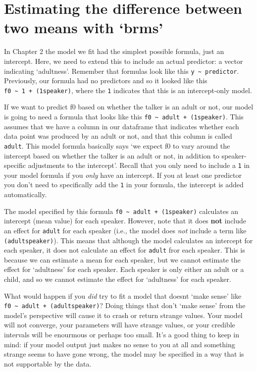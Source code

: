 \documentclass[
]{book}
\begin{document}
\hypertarget{estimating-the-difference-between-two-means-with-brms}{%
\section{Estimating the difference between two means with `brms'}\label{estimating-the-difference-between-two-means-with-brms}}

In Chapter 2 the model we fit had the simplest possible formula, just an intercept. Here, we need to extend this to include an actual predictor: a vector indicating `adultness'. Remember that formulas look like this \texttt{y\ \textasciitilde{}\ predictor}. Previously, our formula had no predictors and so it looked like this \texttt{f0\ \textasciitilde{}\ 1\ +\ (1\textbar{}speaker)}, where the \texttt{1} indicates that this is an intercept-only model.

If we want to predict f0 based on whether the talker is an adult or not, our model is going to need a formula that looks like this \texttt{f0\ \textasciitilde{}\ adult\ +\ (1\textbar{}speaker)}. This assumes that we have a column in our dataframe that indicates whether each data point was produced by an adult or not, and that this column is called \texttt{adult}. This model formula basically says `we expect f0 to vary around the intercept based on whether the talker is an adult or not, in addition to speaker-specific adjustments to the intercept'. Recall that you only need to include a \texttt{1} in your model formula if you \emph{only} have an intercept. If you at least one predictor you don't need to specifically add the \texttt{1} in your formula, the intercept is added automatically.

The model specified by this formula \texttt{f0\ \textasciitilde{}\ adult\ +\ (1\textbar{}speaker)} calculates an intercept (mean value) for each speaker. However, note that it does \textbf{not} include an effect for \texttt{adult} for each speaker (i.e., the model does \emph{not} include a term like \texttt{(adult\textbar{}speaker)}). This means that although the model calculates an intercept for each speaker, it does not calculate an effect for \texttt{adult} fror each speaker. This is because we can estimate a mean for each speaker, but we cannot estimate the effect for `adultness' for each speaker. Each speaker is only either an adult or a child, and so we cannot estimate the effect for `adultness' for each speaker.

What would happen if you \emph{did} try to fit a model that doesnt `make sense' like \texttt{f0\ \textasciitilde{}\ adult\ +\ (adult\textbar{}speaker)}? Doing things that don't `make sense' from the model's perspective will cause it to crash or return strange values. Your model will not converge, your parameters will have strange values, or your credible intervals will be enourmous or perhaps too small. It's a good thing to keep in mind: if your model output just makes no sense to you at all and something strange seems to have gone wrong, the model may be specified in a way that is not supportable by the data.
\end{document}
